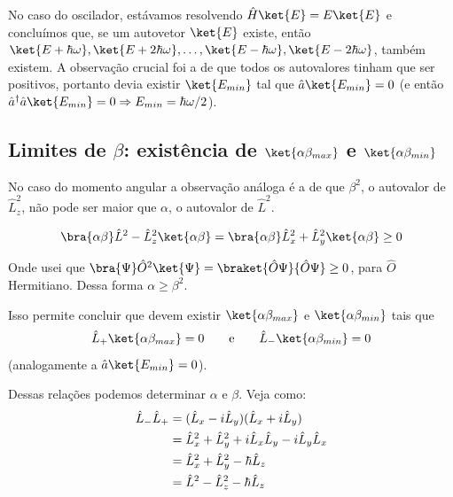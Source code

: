 No caso do oscilador, estávamos resolvendo $\hat{H}\ket{E} = E\ket{E}$ e concluímos que, se um autovetor $\ket{E}$ existe, então $\ket{E+\hbar\omega}, \ket{E+2\hbar\omega}, \dots, \ket{E-\hbar\omega}, \ket{E-2\hbar\omega}$, também existem. A observação crucial foi a de que todos os autovalores tinham que ser positivos, portanto devia existir $\ket{E_{min}}$ tal que $\hat{a}\ket{E_{min}} = 0$ (e então $\hat{a}^\dagger \hat{a} \ket{E_{min}} = 0 \Rightarrow E_{min} = \hbar\omega/2$).

\subsection*{Limites de $\beta$: existência de $\ket{\alpha\beta_{max}}$ e $\ket{\alpha\beta_{min}}$}

No caso do momento angular a observação análoga é a de que $\beta^2$, o autovalor de $\hat{L}_z^2$, não pode ser maior que $\alpha$, o autovalor de $\hat{L}^2$.

\begin{equation}
    \bra{\alpha\beta} \hat{L}^2 - \hat{L}_z^2 \ket{\alpha\beta} = \bra{\alpha\beta} \hat{L}_x^2 + \hat{L}_y^2 \ket{\alpha\beta} \geq 0
\label{eq:aula20_L2_menos_Lz2}
\end{equation}

Onde usei que $\bra{\Psi} \hat{O}^2 \ket{\Psi} = \braket{\hat{O}\Psi}{\hat{O}\Psi} \geq 0$, para $\hat{O}$ Hermitiano. Dessa forma $\alpha \geq \beta^2$.

Isso permite concluir que devem existir $\ket{\alpha\beta_{max}}$ e $\ket{\alpha\beta_{min}}$ tais que
\begin{equation}
    \hat{L}_+ \ket{\alpha\beta_{max}} = 0 \qquad \text{e} \qquad \hat{L}_- \ket{\alpha\beta_{min}} = 0
\label{eq:aula20_Lpm_extremos}
\end{equation}
(analogamente a $\hat{a}\ket{E_{min}} = 0$).

Dessas relações podemos determinar $\alpha$ e $\beta$. Veja como:
\begin{align}
    \hat{L}_- \hat{L}_+ &= (\hat{L}_x - i\hat{L}_y)(\hat{L}_x + i\hat{L}_y) \notag \\
    &= \hat{L}_x^2 + \hat{L}_y^2 + i\hat{L}_x\hat{L}_y - i\hat{L}_y\hat{L}_x \notag \\
    &= \hat{L}_x^2 + \hat{L}_y^2 - \hbar \hat{L}_z \notag \\
    &= \hat{L}^2 - \hat{L}_z^2 - \hbar \hat{L}_z
\label{eq:aula20_LmenosLmais}
\end{align}

